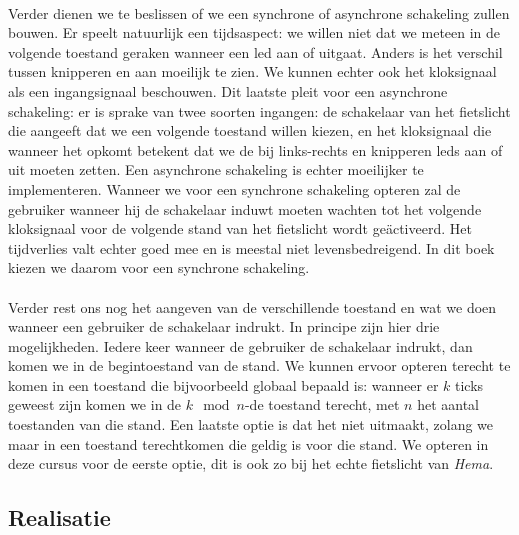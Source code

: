 \paragraph{}
Verder dienen we te beslissen of we een synchrone of asynchrone schakeling zullen bouwen. Er speelt natuurlijk een tijdsaspect: we willen niet dat we meteen in de volgende toestand geraken wanneer een led aan of uitgaat. Anders is het verschil tussen knipperen en aan moeilijk te zien. We kunnen echter ook het kloksignaal als een ingangsignaal beschouwen. Dit laatste pleit voor een asynchrone schakeling: er is sprake van twee soorten ingangen: de schakelaar van het fietslicht die aangeeft dat we een volgende toestand willen kiezen, en het kloksignaal die wanneer het opkomt betekent dat we de bij links-rechts en knipperen leds aan of uit moeten zetten. Een asynchrone schakeling is echter moeilijker te implementeren. Wanneer we voor een synchrone schakeling opteren zal de gebruiker wanneer hij de schakelaar induwt moeten wachten tot het volgende kloksignaal voor de volgende stand van het fietslicht wordt ge\"activeerd. Het tijdverlies valt echter goed mee en is meestal niet levensbedreigend. In dit boek kiezen we daarom voor een synchrone schakeling.
\paragraph{}
Verder rest ons nog het aangeven van de verschillende toestand en wat we doen wanneer een gebruiker de schakelaar indrukt. In principe zijn hier drie mogelijkheden. Iedere keer wanneer de gebruiker de schakelaar indrukt, dan komen we in de begintoestand van de stand. We kunnen ervoor opteren terecht te komen in een toestand die bijvoorbeeld globaal bepaald is: wanneer er $k$ ticks geweest zijn komen we in de $k\mod n$-de toestand terecht, met $n$ het aantal toestanden van die stand. Een laatste optie is dat het niet uitmaakt, zolang we maar in een toestand terechtkomen die geldig is voor die stand. We opteren in deze cursus voor de eerste optie, dit is ook zo bij het echte fietslicht van \emph{Hema}.
\subsection{Realisatie}
